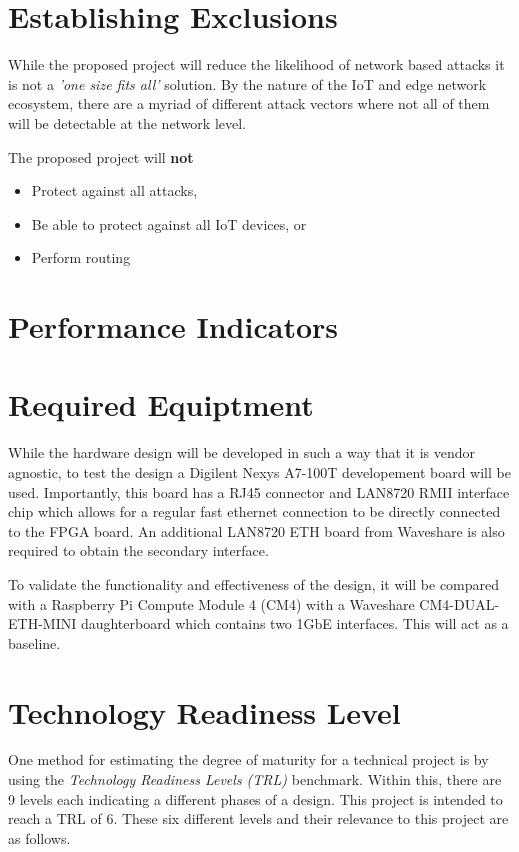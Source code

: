 \section{Establishing Exclusions}

While the proposed project will reduce the likelihood of network based attacks it is not a \textit{'one size fits all'} solution. 
By the nature of the IoT and edge network ecosystem, there are a myriad of different attack vectors where not all of them will be detectable at the
network level.

The proposed project will \textbf{not}
\begin{itemize}
    \item Protect against all attacks,
    \item Be able to protect against all IoT devices, or
    \item Perform routing
\end{itemize}



\section{Performance Indicators}



\section{Required Equiptment}
While the hardware design will be developed in such a way that it is vendor agnostic, to test the design a Digilent Nexys A7-100T developement board will be used.
Importantly, this board has a RJ45 connector and LAN8720 RMII interface chip which allows for a regular fast ethernet connection to be directly connected 
to the FPGA board. An additional LAN8720 ETH board from Waveshare is also required to obtain the secondary interface. 

To validate the functionality and effectiveness of the design, it will be compared with a Raspberry Pi Compute Module 4 (CM4) with a Waveshare CM4-DUAL-ETH-MINI 
daughterboard which contains two 1GbE interfaces. This will act as a baseline. 

\section{Technology Readiness Level}

One method for estimating the degree of maturity for a technical project is by using the \textit{Technology Readiness Levels (TRL)} benchmark. Within this, 
there are 9 levels each indicating a different phases of a design. This project is intended to reach a TRL of 6. These six different levels and their 
relevance to this project are as follows. 

